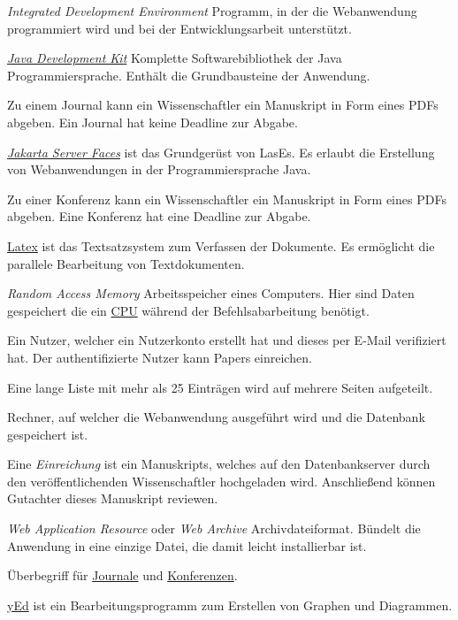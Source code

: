 \begin{description}
	 \emph{Integrated Development Environment} Programm, in der die Webanwendung programmiert wird und bei der Entwicklungsarbeit unterstützt.

	 \href{https://www.oracle.com/java/technologies/downloads/}{\emph{Java Development Kit}} Komplette Softwarebibliothek der Java Programmiersprache. Enthält die Grundbausteine der Anwendung.

	 Zu einem Journal kann ein Wissenschaftler ein Manuskript in Form eines PDFs abgeben. Ein Journal hat keine Deadline zur Abgabe.

	 \href{https://jakarta.ee/specifications/faces/}{\emph{Jakarta Server Faces}} ist das Grundgerüst von LasEs. Es erlaubt die Erstellung von Webanwendungen in der Programmiersprache Java.

	 Zu einer Konferenz kann ein Wissenschaftler ein Manuskript in Form eines PDFs abgeben. Eine Konferenz hat eine Deadline zur Abgabe.

	 \href{https://www.latex-project.org/}{Latex} ist das Textsatzsystem zum Verfassen der Dokumente. Es ermöglicht die parallele Bearbeitung von Textdokumenten.

	 \emph{Random Access Memory} Arbeitsspeicher eines Computers. Hier sind Daten gespeichert die ein \hyperref[glo:cpu]{CPU} während der Befehlsabarbeitung benötigt.

	 Ein Nutzer, welcher ein Nutzerkonto erstellt hat und dieses per E-Mail verifiziert hat. Der authentifizierte Nutzer kann Papers einreichen.

	 Eine lange Liste mit mehr als 25 Einträgen wird auf mehrere Seiten aufgeteilt.

	 Rechner, auf welcher die Webanwendung ausgeführt wird und die Datenbank gespeichert ist.

	 Eine \emph{Einreichung} ist ein Manuskripts, welches auf den Datenbankserver durch den veröffentlichenden Wissenschaftler hochgeladen wird. Anschließend können Gutachter dieses Manuskript reviewen.

	 \emph{Web Application Resource} oder \emph{Web Archive} Archivdateiformat. Bündelt die Anwendung in eine einzige Datei, die damit leicht installierbar ist.

	 Überbegriff für \hyperref[glo:journal]{Journale} und \hyperref[glo:konf]{Konferenzen}.

	 \href{https://www.yworks.com/products/yed}{yEd} ist ein Bearbeitungsprogramm zum Erstellen von Graphen und Diagrammen.
\end{description}